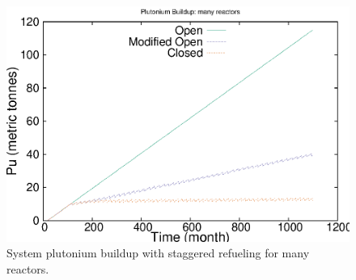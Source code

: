 \begin{figure}[H]
\label{fig:puseriesn}
\caption{System plutonium buildup with staggered refueling for many reactors.}
\begin{center}
\includegraphics{./images/puseries-n.eps}
\end{center}
\end{figure}

